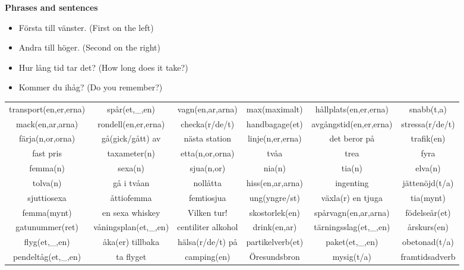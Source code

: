 
\begin{flushleft}
    \textbf{Phrases and sentences}
    \begin{itemize}
        \item Första till vänster. (First on the left)
        \item Andra till höger. (Second on the right)
        \item Hur lång tid tar det? (How long does it take?)
        \item Kommer du ihåg? (Do you remember?)
    \end{itemize}
\end{flushleft}

\begin{center}
    \begin{adjustwidth}{-2.5cm}{}
        \begin{tabular}{|c c c c c c|}
            \hline
            transport(en,er,erna) & spår(et,\_,en) & vagn(en,ar,arna) & max(maximalt) & hållplats(en,er,erna) & snabb(t,a) \\
            mack(en,ar,arna) & rondell(en,er,erna) & checka(r/de/t) & handbagage(et) & avgångstid(en,er,erna) & stressa(r/de/t) \\
            färja(n,or,orna) & gå(gick/gått) av & nästa station & linje(n,er,erna) & det beror på & trafik(en) \\
            fast pris & taxameter(n) & etta(n,or,orna) & tvåa & trea & fyra \\
            femma(n) & sexa(n) & sjua(n,or) & nia(n) & tia(n) & elva(n)  \\
            tolva(n) & gå i tvåan & nollåtta & hiss(en,ar,arna) & ingenting & jättenöjd(t/a) \\
            sjuttiosexa & åttiofemma & femtiosjua & ung(yngre/st) & växla(r) en tjuga & tia(mynt) \\
            femma(mynt) & en sexa whiskey & Vilken tur! & skostorlek(en) & spårvagn(en,ar,arna) & födelseår(et) \\
            gatunummer(ret) & våningsplan(et,\_,en) & centiliter alkohol & drink(en,ar) & tärningsslag(et,\_,en) & årskurs(en) \\
            flyg(et,\_,en) & åka(er) tillbaka & hälsa(r/de/t) på & partikelverb(et) & paket(et,\_,en) & obetonad(t/a) \\
            pendeltåg(et,\_,en) & ta flyget & camping(en) & Öresundsbron & mysig(t/a) & framtidsadverb \\

\end{tabular}
\end{adjustwidth}
\end{center}
